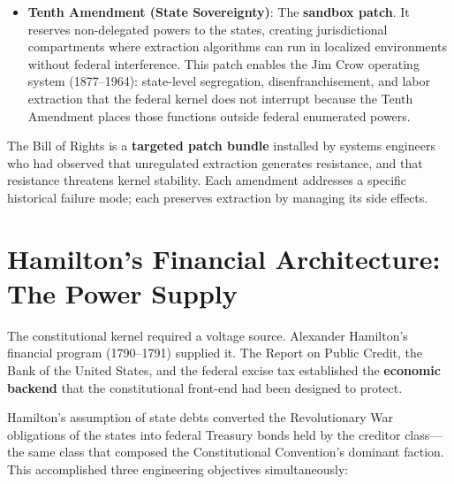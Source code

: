\begin{itemize}
    \item \textbf{Tenth Amendment (State Sovereignty)}: The \textbf{sandbox patch}. It reserves non-delegated powers to the states, creating jurisdictional compartments where extraction algorithms can run in localized environments without federal interference. This patch enables the Jim Crow operating system (1877--1964): state-level segregation, disenfranchisement, and labor extraction that the federal kernel does not interrupt because the Tenth Amendment places those functions outside federal enumerated powers.
\end{itemize}

The Bill of Rights is a \textbf{targeted patch bundle} installed by systems engineers who had observed that unregulated extraction generates resistance, and that resistance threatens kernel stability. Each amendment addresses a specific historical failure mode; each preserves extraction by managing its side effects.

\section{Hamilton's Financial Architecture: The Power Supply}

The constitutional kernel required a voltage source. Alexander Hamilton's financial program (1790--1791) supplied it. The Report on Public Credit, the Bank of the United States, and the federal excise tax established the \textbf{economic backend} that the constitutional front-end had been designed to protect.

Hamilton's assumption of state debts converted the Revolutionary War obligations of the states into federal Treasury bonds held by the creditor class---the same class that composed the Constitutional Convention's dominant faction. This accomplished three engineering objectives simultaneously:

